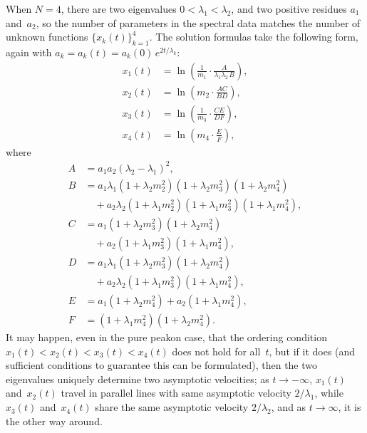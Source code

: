 \documentclass[10pt,a4paper]{article} \pdfoutput=1 
\begin{document}
\begin{example}
  When $N=4$, there are two eigenvalues
  $0 < \lambda_1 < \lambda_2$,
  and two positive residues $a_1$ and~$a_2$,
  so the number of parameters in the spectral data
  matches the number of unknown functions $\{ x_k(t) \}_{k=1}^4$.
  The solution formulas take the following form, again with
  $a_k = a_k(t) = a_k(0) \, e^{2t/\lambda_k}$:
  \begin{equation}
    \begin{aligned}
      x_1(t) &= \ln \left( \frac{1}{m_1}\cdot\frac{A}{\lambda_1\lambda_2 \, B} \right)
      ,\\
      x_2(t) &= \ln \left( m_2 \cdot \frac{AC}{BD} \right)
      ,\\
      x_3(t) &= \ln \left( \frac{1}{m_3} \cdot \frac{CE}{DF} \right)
      ,\\
      x_4(t) &= \ln\left(m_4\cdot\frac{E}{F}\right)
      ,
    \end{aligned}
  \end{equation}
  where
  \begin{equation}
    \begin{aligned}
      A &= a_1a_2(\lambda_2-\lambda_1)^2
      ,\\
      B &= a_1\lambda_1(1+\lambda_2m_2^2)(1+\lambda_2m_3^2)(1+\lambda_2m_4^2)
      \\ & \quad
      + a_2\lambda_2(1+\lambda_1m_2^2)(1+\lambda_1m_3^2)(1+\lambda_1m_4^2)
      ,\\
      C &= a_1(1+\lambda_2m_3^2)(1+\lambda_2m_4^2)
      \\ & \quad
      + a_2(1+\lambda_1m_3^2)(1+\lambda_1m_4^2)
      ,\\
      D &= a_1\lambda_1(1+\lambda_2m_3^2)(1+\lambda_2m_4^2)
      \\ & \quad
      + a_2\lambda_2(1+\lambda_1m_3^2)(1+\lambda_1m_4^2)
      ,\\
      E &= a_1(1+\lambda_2m_4^2) + a_2(1+\lambda_1m_4^2)
      ,\\
      F &= (1+\lambda_1m_4^2)(1+\lambda_2m_4^2)
      .
    \end{aligned}
  \end{equation}
  It may happen, even in the pure peakon case,
  that the ordering condition $x_1(t) < x_2(t) < x_3(t) < x_4(t)$
  does not hold for all~$t$, but if it does (and sufficient conditions
  to guarantee this can be formulated),
  then the two eigenvalues uniquely determine two asymptotic velocities;
  as $t \to -\infty$,
  $x_1(t)$ and~$x_2(t)$ travel in parallel lines with same asymptotic velocity $2/\lambda_1$,
  while $x_3(t)$ and~$x_4(t)$ share the same asymptotic velocity $2/\lambda_2$,
  and as $t \to \infty$, it is the other way around.
\end{example}
\end{document}
